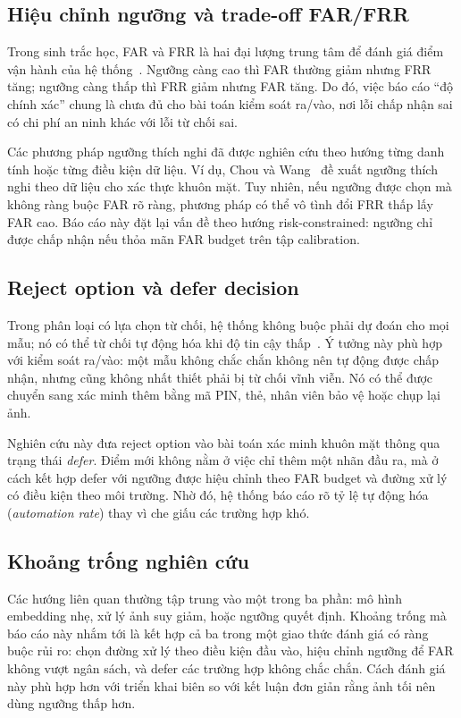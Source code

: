 \subsection{Hiệu chỉnh ngưỡng và trade-off FAR/FRR}

Trong sinh trắc học, FAR và FRR là hai đại lượng trung tâm để đánh giá điểm vận hành của hệ thống~\cite{jain2004biometric}. Ngưỡng càng cao thì FAR thường giảm nhưng FRR tăng; ngưỡng càng thấp thì FRR giảm nhưng FAR tăng. Do đó, việc báo cáo ``độ chính xác'' chung là chưa đủ cho bài toán kiểm soát ra/vào, nơi lỗi chấp nhận sai có chi phí an ninh khác với lỗi từ chối sai.

Các phương pháp ngưỡng thích nghi đã được nghiên cứu theo hướng từng danh tính hoặc từng điều kiện dữ liệu. Ví dụ, Chou và Wang~\cite{chou2018adaptive} đề xuất ngưỡng thích nghi theo dữ liệu cho xác thực khuôn mặt. Tuy nhiên, nếu ngưỡng được chọn mà không ràng buộc FAR rõ ràng, phương pháp có thể vô tình đổi FRR thấp lấy FAR cao. Báo cáo này đặt lại vấn đề theo hướng risk-constrained: ngưỡng chỉ được chấp nhận nếu thỏa mãn FAR budget trên tập calibration.

\subsection{Reject option và defer decision}

Trong phân loại có lựa chọn từ chối, hệ thống không buộc phải dự đoán cho mọi mẫu; nó có thể từ chối tự động hóa khi độ tin cậy thấp~\cite{chow1970optimum,geifman2017selective}. Ý tưởng này phù hợp với kiểm soát ra/vào: một mẫu không chắc chắn không nên tự động được chấp nhận, nhưng cũng không nhất thiết phải bị từ chối vĩnh viễn. Nó có thể được chuyển sang xác minh thêm bằng mã PIN, thẻ, nhân viên bảo vệ hoặc chụp lại ảnh.

Nghiên cứu này đưa reject option vào bài toán xác minh khuôn mặt thông qua trạng thái \textit{defer}. Điểm mới không nằm ở việc chỉ thêm một nhãn đầu ra, mà ở cách kết hợp defer với ngưỡng được hiệu chỉnh theo FAR budget và đường xử lý có điều kiện theo môi trường. Nhờ đó, hệ thống báo cáo rõ tỷ lệ tự động hóa (\textit{automation rate}) thay vì che giấu các trường hợp khó.

\subsection{Khoảng trống nghiên cứu}

Các hướng liên quan thường tập trung vào một trong ba phần: mô hình embedding nhẹ, xử lý ảnh suy giảm, hoặc ngưỡng quyết định. Khoảng trống mà báo cáo này nhắm tới là kết hợp cả ba trong một giao thức đánh giá có ràng buộc rủi ro: chọn đường xử lý theo điều kiện đầu vào, hiệu chỉnh ngưỡng để FAR không vượt ngân sách, và defer các trường hợp không chắc chắn. Cách đánh giá này phù hợp hơn với triển khai biên so với kết luận đơn giản rằng ảnh tối nên dùng ngưỡng thấp hơn.
